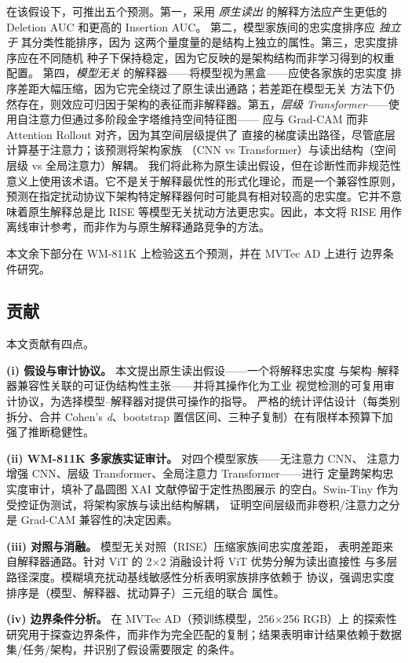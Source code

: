 \documentclass[11pt,a4paper]{article}
\begin{document}
在该假设下，可推出五个预测。第一，采用 \emph{原生读出} 的解释方法应产生更低的 Deletion AUC 和更高的 Insertion AUC。 第二，模型家族间的忠实度排序应 \emph{独立于} 其分类性能排序，因为 这两个量度量的是结构上独立的属性。第三，忠实度排序应在不同随机 种子下保持稳定，因为它反映的是架构结构而非学习得到的权重配置。 第四，\emph{模型无关} 的解释器——将模型视为黑盒——应使各家族的忠实度 排序差距大幅压缩，因为它完全绕过了原生读出通路；若差距在模型无关 方法下仍然存在，则效应可归因于架构的表征而非解释器。第五，\emph{层级 Transformer}——使用自注意力但通过多阶段金字塔维持空间特征图—— 应与 Grad-CAM 而非 Attention Rollout 对齐，因为其空间层级提供了 直接的梯度读出路径，尽管底层计算基于注意力；该预测将架构家族 （CNN vs Transformer）与读出结构（空间层级 vs 全局注意力）解耦。 我们将此称为原生读出假设，但在诊断性而非规范性意义上使用该术语。它不是关于解释最优性的形式化理论，而是一个兼容性原则，预测在指定扰动协议下架构特定解释器何时可能具有相对较高的忠实度。它并不意味着原生解释总是比 RISE 等模型无关扰动方法更忠实。因此，本文将 RISE 用作离线审计参考，而非作为与原生解释通路竞争的方法。

本文余下部分在 WM-811K 上检验这五个预测，并在 MVTec AD 上进行 边界条件研究。

\subsection{贡献}

本文贡献有四点。

\textbf{(i) 假设与审计协议。} 本文提出原生读出假设——一个将解释忠实度 与架构–解释器兼容性关联的可证伪结构性主张——并将其操作化为工业 视觉检测的可复用审计协议，为选择模型–解释器对提供可操作的指导。 严格的统计评估设计（每类别拆分、合并 Cohen’s \emph{d}、bootstrap 置信区间、三种子复制）在有限样本预算下加强了推断稳健性。

\textbf{(ii) WM-811K 多家族实证审计。} 对四个模型家族——无注意力 CNN、 注意力增强 CNN、层级 Transformer、全局注意力 Transformer——进行 定量跨架构忠实度审计，填补了晶圆图 XAI 文献停留于定性热图展示 的空白。Swin-Tiny 作为受控证伪测试，将架构家族与读出结构解耦， 证明空间层级而非卷积/注意力之分是 Grad-CAM 兼容性的决定因素。

\textbf{(iii) 对照与消融。} 模型无关对照（RISE）压缩家族间忠实度差距， 表明差距来自解释器通路。针对 ViT 的 2×2 消融设计将 ViT 优势分解为读出直接性 与多层路径深度。模糊填充扰动基线敏感性分析表明家族排序依赖于 协议，强调忠实度排序是（模型、解释器、扰动算子）三元组的联合 属性。

\textbf{(iv) 边界条件分析。} 在 MVTec AD（预训练模型，256×256 RGB）上 的探索性研究用于探查边界条件，而非作为完全匹配的复制；结果表明审计结果依赖于数据集/任务/架构，并识别了假设需要限定 的条件。
\end{document}
